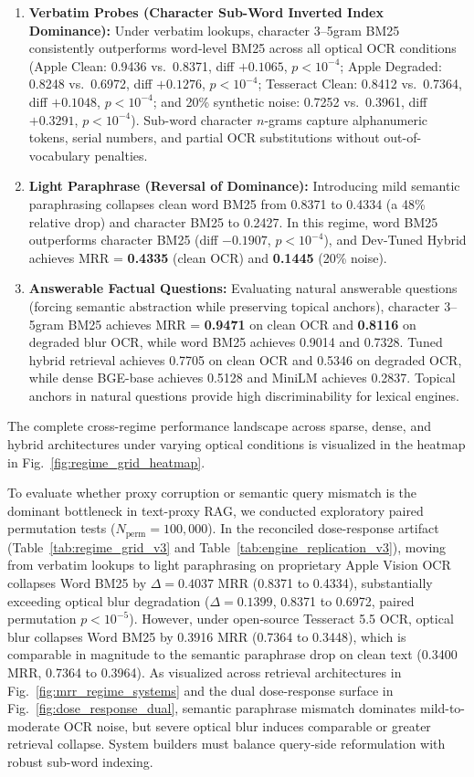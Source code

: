 \documentclass[conference]{IEEEtran}
\begin{document}
\begin{enumerate}
    \setlength{\itemsep}{0.2pt plus 0.1pt}
    \setlength{\parskip}{0pt}
    \item \textbf{Verbatim Probes (Character Sub-Word Inverted Index Dominance):} Under verbatim lookups, character 3--5gram BM25 consistently outperforms word-level BM25 across all optical OCR conditions (Apple Clean: 0.9436 vs.\ 0.8371, diff $+0.1065$, $p < 10^{-4}$; Apple Degraded: 0.8248 vs.\ 0.6972, diff $+0.1276$, $p < 10^{-4}$; Tesseract Clean: 0.8412 vs.\ 0.7364, diff $+0.1048$, $p < 10^{-4}$; and 20\% synthetic noise: 0.7252 vs.\ 0.3961, diff $+0.3291$, $p < 10^{-4}$). Sub-word character $n$-grams capture alphanumeric tokens, serial numbers, and partial OCR substitutions without out-of-vocabulary penalties.
    \item \textbf{Light Paraphrase (Reversal of Dominance):} Introducing mild semantic paraphrasing collapses clean word BM25 from 0.8371 to 0.4334 (a 48\% relative drop) and character BM25 to 0.2427. In this regime, word BM25 outperforms character BM25 (diff $-0.1907$, $p < 10^{-4}$), and Dev-Tuned Hybrid achieves MRR = \textbf{0.4335} (clean OCR) and \textbf{0.1445} (20\% noise).
    \item \textbf{Answerable Factual Questions:} Evaluating natural answerable questions (forcing semantic abstraction while preserving topical anchors), character 3--5gram BM25 achieves MRR = \textbf{0.9471} on clean OCR and \textbf{0.8116} on degraded blur OCR, while word BM25 achieves 0.9014 and 0.7328. Tuned hybrid retrieval achieves 0.7705 on clean OCR and 0.5346 on degraded OCR, while dense BGE-base achieves 0.5128 and MiniLM achieves 0.2837. Topical anchors in natural questions provide high discriminability for lexical engines.
\end{enumerate}

The complete cross-regime performance landscape across sparse, dense, and hybrid architectures under varying optical conditions is visualized in the heatmap in Fig.~\ref{fig:regime_grid_heatmap}.

To evaluate whether proxy corruption or semantic query mismatch is the dominant bottleneck in text-proxy RAG, we conducted exploratory paired permutation tests ($N_{\text{perm}}=100{,}000$). In the reconciled dose-response artifact (Table~\ref{tab:regime_grid_v3} and Table~\ref{tab:engine_replication_v3}), moving from verbatim lookups to light paraphrasing on proprietary Apple Vision OCR collapses Word BM25 by $\Delta = 0.4037$ MRR (0.8371 to 0.4334), substantially exceeding optical blur degradation ($\Delta = 0.1399$, 0.8371 to 0.6972, paired permutation $p < 10^{-5}$). However, under open-source Tesseract 5.5 OCR, optical blur collapses Word BM25 by 0.3916 MRR (0.7364 to 0.3448), which is comparable in magnitude to the semantic paraphrase drop on clean text (0.3400 MRR, 0.7364 to 0.3964). As visualized across retrieval architectures in Fig.~\ref{fig:mrr_regime_systems} and the dual dose-response surface in Fig.~\ref{fig:dose_response_dual}, semantic paraphrase mismatch dominates mild-to-moderate OCR noise, but severe optical blur induces comparable or greater retrieval collapse. System builders must balance query-side reformulation with robust sub-word indexing.
\end{document}
